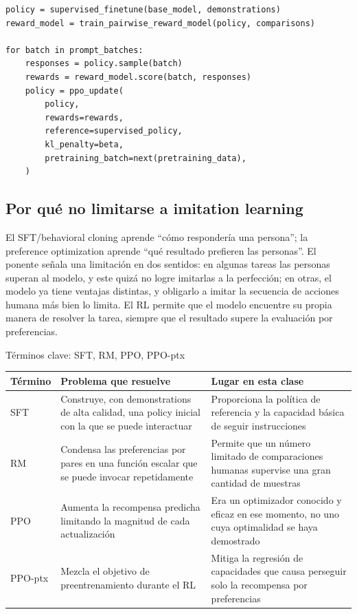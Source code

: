 \begin{lstlisting}[caption={Pseudocódigo mínimo de las tres etapas de RLHF}]
policy = supervised_finetune(base_model, demonstrations)
reward_model = train_pairwise_reward_model(policy, comparisons)

for batch in prompt_batches:
    responses = policy.sample(batch)
    rewards = reward_model.score(batch, responses)
    policy = ppo_update(
        policy,
        rewards=rewards,
        reference=supervised_policy,
        kl_penalty=beta,
        pretraining_batch=next(pretraining_data),
    )
\end{lstlisting}

\subsection{Por qué no limitarse a imitation learning}

El SFT/behavioral cloning aprende ``cómo respondería una persona''; la preference optimization aprende ``qué resultado prefieren las personas''. El ponente señala una limitación en dos sentidos: en algunas tareas las personas superan al modelo, y este quizá no logre imitarlas a la perfección; en otras, el modelo ya tiene ventajas distintas, y obligarlo a imitar la secuencia de acciones humana más bien lo limita. El RL permite que el modelo encuentre su propia manera de resolver la tarea, siempre que el resultado supere la evaluación por preferencias.

\begin{knowledgebox}{Términos clave: SFT, RM, PPO, PPO-ptx}
\begin{tabularx}{\textwidth}{L{2.2cm} >{\raggedright\arraybackslash}X >{\raggedright\arraybackslash}X}
\toprule
Término & Problema que resuelve & Lugar en esta clase \\
\midrule
SFT & Construye, con demonstrations de alta calidad, una policy inicial con la que se puede interactuar & Proporciona la política de referencia y la capacidad básica de seguir instrucciones \\
RM & Condensa las preferencias por pares en una función escalar que se puede invocar repetidamente & Permite que un número limitado de comparaciones humanas supervise una gran cantidad de muestras \\
PPO & Aumenta la recompensa predicha limitando la magnitud de cada actualización & Era un optimizador conocido y eficaz en ese momento, no uno cuya optimalidad se haya demostrado \\
PPO-ptx & Mezcla el objetivo de preentrenamiento durante el RL & Mitiga la regresión de capacidades que causa perseguir solo la recompensa por preferencias \\
\bottomrule
\end{tabularx}
\end{knowledgebox}


